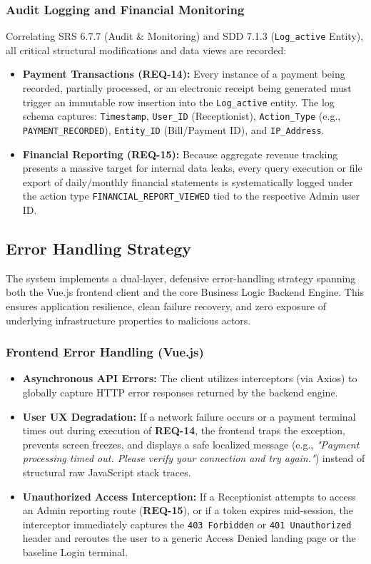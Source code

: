 \subsubsection{Audit Logging and Financial Monitoring}
Correlating SRS 6.7.7 (Audit \& Monitoring) and SDD 7.1.3 (\texttt{Log\_active} Entity), all critical structural modifications and data views are recorded:
\begin{itemize}
	\item \textbf{Payment Transactions (REQ-14):} Every instance of a payment being recorded, partially processed, or an electronic receipt being generated must trigger an immutable row insertion into the \texttt{Log\_active} entity. The log schema captures: \texttt{Timestamp}, \texttt{User\_ID} (Receptionist), \texttt{Action\_Type} (e.g., \texttt{PAYMENT\_RECORDED}), \texttt{Entity\_ID} (Bill/Payment ID), and \texttt{IP\_Address}.
	\item \textbf{Financial Reporting (REQ-15):} Because aggregate revenue tracking presents a massive target for internal data leaks, every query execution or file export of daily/monthly financial statements is systematically logged under the action type \texttt{FINANCIAL\_REPORT\_VIEWED} tied to the respective Admin user ID.
\end{itemize}

\newpage
\subsection{Error Handling Strategy}
\label{subsec:error_handling_strategy}

The system implements a dual-layer, defensive error-handling strategy spanning both the Vue.js frontend client and the core Business Logic Backend Engine. This ensures application resilience, clean failure recovery, and zero exposure of underlying infrastructure properties to malicious actors.

\subsubsection{Frontend Error Handling (Vue.js)}
\begin{itemize}
	\item \textbf{Asynchronous API Errors:} The client utilizes interceptors (via Axios) to globally capture HTTP error responses returned by the backend engine. 
	\item \textbf{User UX Degradation:} If a network failure occurs or a payment terminal times out during execution of \textbf{REQ-14}, the frontend traps the exception, prevents screen freezes, and displays a safe localized message (e.g., \textit{"Payment processing timed out. Please verify your connection and try again."}) instead of structural raw JavaScript stack traces.
	\item \textbf{Unauthorized Access Interception:} If a Receptionist attempts to access an Admin reporting route (\textbf{REQ-15}), or if a token expires mid-session, the interceptor immediately captures the \texttt{403 Forbidden} or \texttt{401 Unauthorized} header and reroutes the user to a generic Access Denied landing page or the baseline Login terminal.
\end{itemize}

